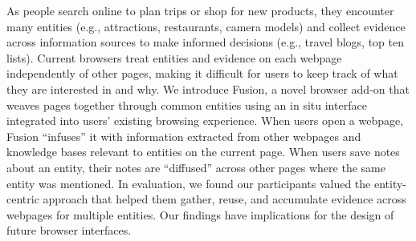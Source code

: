 
As people search online to plan trips or shop for new products, they encounter many entities (e.g., attractions, restaurants, camera models) and collect evidence across information sources to make informed decisions (e.g., travel blogs, top ten lists). Current browsers treat entities and evidence on each webpage independently of other pages, making it difficult for users to keep track of what they are interested in and why. We introduce Fusion, a novel browser add-on that weaves pages together through common entities using an in situ interface integrated into users' existing browsing experience. When users open a webpage, Fusion ``infuses'' it with information extracted from other webpages and knowledge bases relevant to entities on the current page. When users save notes about an entity, their notes are ``diffused'' across other pages where the same entity was mentioned. In evaluation, we found our participants valued the entity-centric approach that helped them gather, reuse, and accumulate evidence across webpages for multiple entities. Our findings have implications for the design of future browser interfaces.



